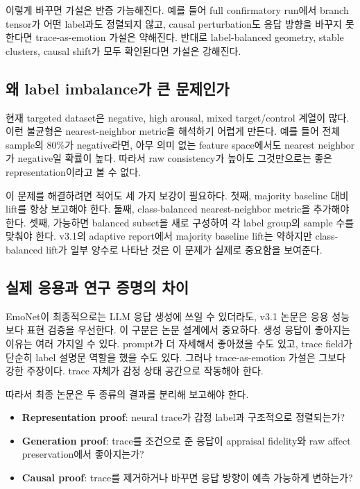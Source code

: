 \documentclass[11pt,a4paper]{article}
\begin{document}
이렇게 바꾸면 가설은 반증 가능해진다. 예를 들어 full confirmatory run에서 branch tensor가 어떤 label과도 정렬되지 않고, causal perturbation도 응답 방향을 바꾸지 못한다면 trace-as-emotion 가설은 약해진다. 반대로 label-balanced geometry, stable clusters, causal shift가 모두 확인된다면 가설은 강해진다.

\subsection{왜 label imbalance가 큰 문제인가}

현재 targeted dataset은 negative, high arousal, mixed target/control 계열이 많다. 이런 불균형은 nearest-neighbor metric을 해석하기 어렵게 만든다. 예를 들어 전체 sample의 80\%가 negative라면, 아무 의미 없는 feature space에서도 nearest neighbor가 negative일 확률이 높다. 따라서 raw consistency가 높아도 그것만으로는 좋은 representation이라고 볼 수 없다.

이 문제를 해결하려면 적어도 세 가지 보강이 필요하다. 첫째, majority baseline 대비 lift를 항상 보고해야 한다. 둘째, class-balanced nearest-neighbor metric을 추가해야 한다. 셋째, 가능하면 balanced subset을 새로 구성하여 각 label group의 sample 수를 맞춰야 한다. v3.1의 adaptive report에서 majority baseline lift는 약하지만 class-balanced lift가 일부 양수로 나타난 것은 이 문제가 실제로 중요함을 보여준다.

\subsection{실제 응용과 연구 증명의 차이}

EmoNet이 최종적으로는 LLM 응답 생성에 쓰일 수 있더라도, v3.1 논문은 응용 성능보다 표현 검증을 우선한다. 이 구분은 논문 설계에서 중요하다. 생성 응답이 좋아지는 이유는 여러 가지일 수 있다. prompt가 더 자세해서 좋아졌을 수도 있고, trace field가 단순히 label 설명문 역할을 했을 수도 있다. 그러나 trace-as-emotion 가설은 그보다 강한 주장이다. trace 자체가 감정 상태 공간으로 작동해야 한다.

따라서 최종 논문은 두 종류의 결과를 분리해 보고해야 한다.

\begin{itemize}
  \item \textbf{Representation proof}: neural trace가 감정 label과 구조적으로 정렬되는가?
  \item \textbf{Generation proof}: trace를 조건으로 준 응답이 appraisal fidelity와 raw affect preservation에서 좋아지는가?
  \item \textbf{Causal proof}: trace를 제거하거나 바꾸면 응답 방향이 예측 가능하게 변하는가?
\end{itemize}
\end{document}

